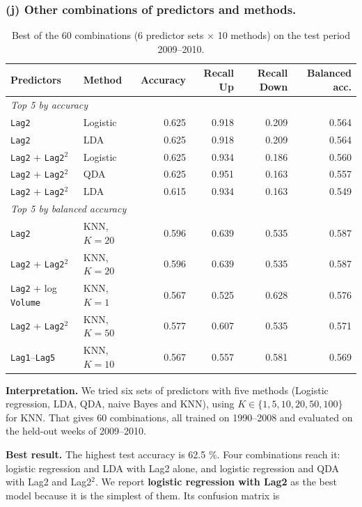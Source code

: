 \documentclass[11pt]{article}
\begin{document}
\subsubsection*{(j) Other combinations of predictors and methods.}

\begin{table}[H]
  \centering
  \small
  \begin{tabular}{llrrrr}
    \toprule
    Predictors & Method & Accuracy & Recall Up & Recall Down & Balanced acc. \\
    \midrule
    \multicolumn{6}{l}{\emph{Top 5 by accuracy}} \\
    \texttt{Lag2} & Logistic & 0.625 & 0.918 & 0.209 & 0.564 \\
    \texttt{Lag2} & LDA & 0.625 & 0.918 & 0.209 & 0.564 \\
    \texttt{Lag2} + \texttt{Lag2}$^2$ & Logistic & 0.625 & 0.934 & 0.186 & 0.560 \\
    \texttt{Lag2} + \texttt{Lag2}$^2$ & QDA & 0.625 & 0.951 & 0.163 & 0.557 \\
    \texttt{Lag2} + \texttt{Lag2}$^2$ & LDA & 0.615 & 0.934 & 0.163 & 0.549 \\
    \midrule
    \multicolumn{6}{l}{\emph{Top 5 by balanced accuracy}} \\
    \texttt{Lag2} & KNN, $K = 20$ & 0.596 & 0.639 & 0.535 & 0.587 \\
    \texttt{Lag2} + \texttt{Lag2}$^2$ & KNN, $K = 20$ & 0.596 & 0.639 & 0.535 & 0.587 \\
    \texttt{Lag2} + log \texttt{Volume} & KNN, $K = 1$ & 0.567 & 0.525 & 0.628 & 0.576 \\
    \texttt{Lag2} + \texttt{Lag2}$^2$ & KNN, $K = 50$ & 0.577 & 0.607 & 0.535 & 0.571 \\
    \texttt{Lag1}--\texttt{Lag5} & KNN, $K = 10$ & 0.567 & 0.557 & 0.581 & 0.569 \\
    \bottomrule
  \end{tabular}
  \caption{Best of the 60 combinations (6 predictor sets $\times$ 10 methods) on the test period 2009--2010.}
\end{table}

\textbf{Interpretation.} We tried six sets of predictors with five methods (Logistic regression, LDA, QDA, naive Bayes and KNN), using \(K \in \{1, 5, 10, 20, 50, 100\}\) for KNN. That gives 60 combinations, all trained on 1990--2008 and evaluated on the held-out weeks of 2009--2010.

\textbf{Best result.} The highest test accuracy is 62.5 \%. Four combinations reach it: logistic regression and LDA with Lag2 alone, and logistic regression and QDA with Lag2 and Lag2$^2$. We report \textbf{logistic regression with Lag2} as the best model because it is the simplest of them. Its confusion matrix is
\end{document}
